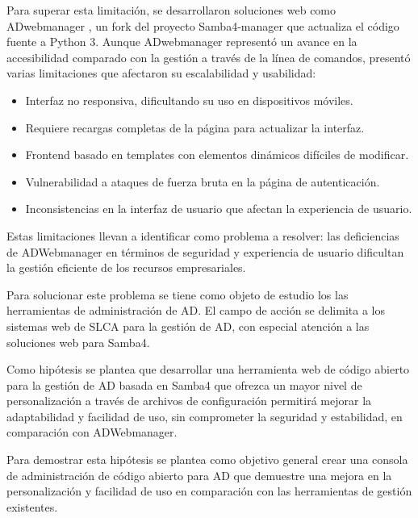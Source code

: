 Para superar esta limitación, se desarrollaron soluciones web como ADwebmanager \autocite{jerez_vicentgjad-webmanager_2024}, un fork del proyecto Samba4-manager \autocite{graber_stgrabersamba4-manager_2024} que actualiza el código fuente a Python 3. Aunque ADwebmanager representó un avance en la accesibilidad comparado con la gestión a través de la línea de comandos, presentó varias limitaciones que afectaron su escalabilidad y usabilidad:

\begin{itemize}
    \item Interfaz no responsiva, dificultando su uso en dispositivos móviles.
    \item Requiere recargas completas de la página para actualizar la interfaz.
    \item Frontend basado en templates con elementos dinámicos difíciles de modificar.
    \item Vulnerabilidad a ataques de fuerza bruta en la página de autenticación.
    \item Inconsistencias en la interfaz de usuario que afectan la experiencia de usuario.
\end{itemize}

Estas limitaciones llevan a identificar como problema a resolver: las deficiencias de ADWebmanager en términos de seguridad y experiencia de usuario dificultan la gestión eficiente de los recursos empresariales.

Para solucionar este problema se tiene como objeto de estudio los las herramientas de administración de AD. El campo de acción se delimita a los sistemas web de SLCA para la gestión de AD, con especial atención a las soluciones web para Samba4.

Como hipótesis se plantea que desarrollar una herramienta web de código abierto para la gestión de AD basada en Samba4 que ofrezca un mayor nivel de personalización a través de archivos de configuración permitirá mejorar la adaptabilidad y facilidad de uso, sin comprometer la seguridad y estabilidad, en comparación con ADWebmanager.

Para demostrar esta hipótesis se plantea como objetivo general crear una consola de administración de código abierto para AD que demuestre una mejora en la personalización y facilidad de uso en comparación con las herramientas de gestión existentes.






